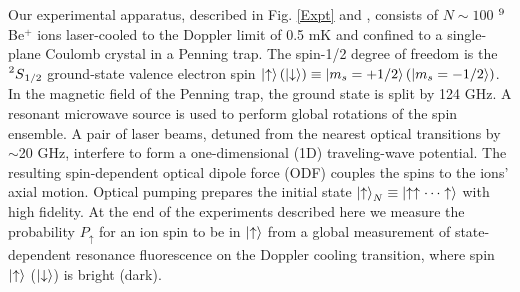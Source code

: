 \documentclass[aps,prl,twocolumn,superscriptaddress,floatfix]{revtex4-1}
\begin{document}
Our experimental apparatus, described in Fig. \ref{Expt} and \citep{Sawyer2014,Bohnet2015}, consists of $N\sim100$ $\prescript{9}{}{}$Be$^{+}$ ions laser-cooled to the Doppler limit of 0.5 mK and confined to a single-plane Coulomb crystal in a Penning trap. The spin-1/2 degree of freedom is the $\prescript{2}{}{S}_{1/2}$ ground-state valence electron spin $\ket{\uparrow} (\ket{\downarrow}) \equiv \ket{m_{s}=+1/2} (\ket{m_{s}=-1/2}) $. In the magnetic field of the Penning trap, the ground state is split by 124 GHz. A resonant microwave source is used to perform global rotations of the spin ensemble. A pair of laser beams, detuned from the nearest optical transitions by $\sim$20 GHz, interfere to form a one-dimensional (1D) traveling-wave potential. The resulting spin-dependent optical dipole force (ODF) couples the spins to the ions' axial motion. Optical pumping prepares the initial state $\ket{\uparrow}_N \equiv \ket{\uparrow \uparrow \cdots \uparrow}$ with high fidelity. At the end of the experiments described here we measure the probability $P_\uparrow$ for an ion spin to be in $\ket{\uparrow}$ from a global measurement of state-dependent resonance fluorescence on the Doppler cooling transition, where spin $\ket{\uparrow}$ ($\ket{\downarrow}$) is bright (dark).
\end{document}
